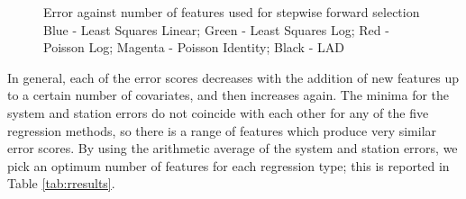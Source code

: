 \documentclass[11pt]{article}
\begin{document}
\begin{figure}
\centering
{}
\captionsetup{singlelinecheck=off, font=scriptsize, justification=centering}
\caption[]{
Error against number of features used for stepwise forward selection\linebreak
Blue - Least Squares Linear; Green - Least Squares Log; Red - Poisson Log; Magenta - Poisson Identity; Black - LAD
}
\label{fig:bfscores}
\end{figure}

In general, each of the error scores decreases with the addition of new features up to a certain number of covariates, and then increases again. The minima for the system and station errors do not coincide with each other for any of the five regression methods, so there is a range of features which produce very similar error scores. By using the arithmetic average of the system and station errors, we pick an optimum number of features for each regression type; this is reported in Table \ref{tab:rresults}.  %
\end{document}

